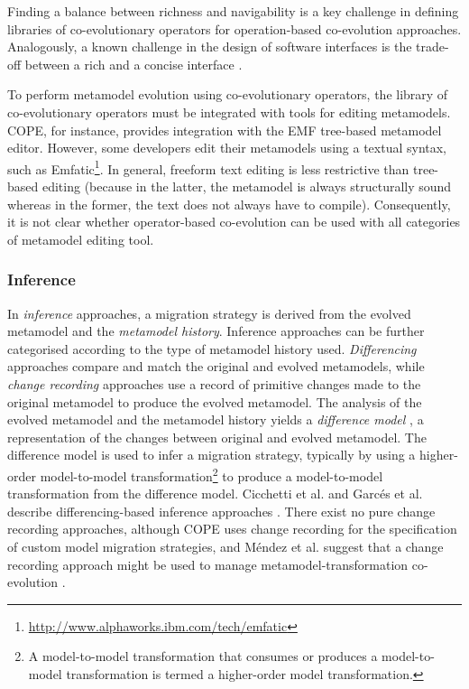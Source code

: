 Finding a balance between richness and navigability is a key challenge in defining libraries of co-evolutionary operators for operation-based co-evolution approaches. Analogously, a known challenge in the design of software interfaces is the trade-off between a rich and a concise interface \cite{bloch05apis}.

To perform metamodel evolution using co-evolutionary operators, the library of co-evolutionary operators must be integrated with tools for editing metamodels. COPE, for instance, provides integration with the EMF tree-based metamodel editor. However, some developers edit their metamodels using a textual syntax, such as Emfatic\footnote{\url{http://www.alphaworks.ibm.com/tech/emfatic}}. In general, freeform text editing is less restrictive than tree-based editing (because in the latter, the metamodel is always structurally sound whereas in the former, the text does not always have to compile). Consequently, it is not clear whether operator-based co-evolution can be used with all categories of metamodel editing tool.

\subsubsection{Inference}
\label{subsec:inference}
\label{subsec:metamodel_matching}
In \emph{inference} approaches, a migration strategy is derived from the evolved metamodel and the \emph{metamodel history}. Inference approaches can be further categorised according to the type of metamodel history used. \emph{Differencing} approaches compare and match the original and evolved metamodels, while \emph{change recording} approaches use a record of primitive changes made to the original metamodel to produce the evolved metamodel. The analysis of the evolved metamodel and the metamodel history yields a \emph{difference model} \cite{cicchetti08automating}, a representation of the changes between original and evolved metamodel. The difference model is used to infer a migration strategy, typically by using a higher-order model-to-model transformation\footnote{A model-to-model transformation that consumes or produces a model-to-model transformation is termed a higher-order model transformation.} to produce a model-to-model transformation from the difference model. Cicchetti \cc et al. and Garc\'{e}s et al. describe differencing-based inference approaches \cite{cicchetti08automating,garces09managing}. There \cc exist no pure change recording approaches, although COPE \cite{herrmannsdoerfer09cope} uses change recording for the specification of custom model migration strategies, and M\'{e}ndez et al. suggest that a change recording approach might be used to manage metamodel-transformation co-evolution \cite{mendez10towards}.


